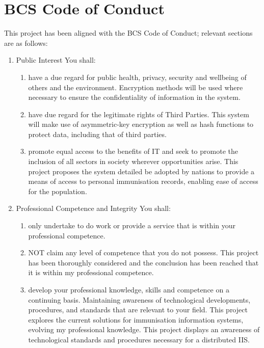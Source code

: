  \section{BCS Code of Conduct}
 This project has been aligned with the BCS Code of Conduct;
 relevant sections are as follows:
 \renewcommand{\labelenumii}{\alph{enumii}}
  \begin{enumerate}
    \item Public Interest
    You shall:
    \begin{enumerate}
      \item have a due regard for public health, privacy,
      security and wellbeing of others and the environment.
      Encryption methods will be used where necessary to
      ensure the confidentiality of information in the
      system.
      \item have due regard for the legitimate rights of Third
      Parties.
      This system will make use of asymmetric-key
      encryption as well as hash functions to protect data,
      including that of third parties.
      \item promote equal access to the benefits of IT and
      seek to promote the inclusion of all sectors in society
      wherever opportunities arise.
      This project proposes the system detailed be adopted
      by nations to provide a means of access to personal
      immunisation records, enabling ease of access for the
      population.
     \end{enumerate}
    \item Professional Competence and Integrity
    You shall:
    \begin{enumerate}
     \item only undertake to do work or provide a service
     that is within your professional competence.
     \item NOT claim any level of competence that you do
     not possess. This project has been thoroughly considered and the
     conclusion has been reached that it is within my
     professional competence.
     \item develop your professional knowledge, skills and
     competence on a continuing basis. Maintaining
     awareness of technological developments,
     procedures, and standards that are relevant to your
     field.
     This project explores the current solutions for
     immunisation information systems, evolving my
     professional knowledge. This project displays an
     awareness of technological standards and procedures necessary for a distributed IIS.

\end{enumerate}
\end{enumerate}
